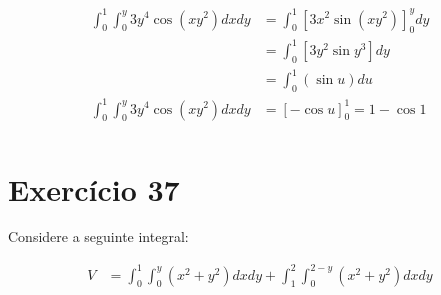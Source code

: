 \documentclass{article}
\theoremstyle{definition}
\begin{document}
        \begin{align*}
            \int_0^1 \int_0^y 3y^4\cos{(xy^2)} dx dy &= \int_0^1 \left[ 3x^2 \sin{(xy^2)} \right]_0^y dy\\
            &= \int_0^1 [3y^2 \sin{y^3}] dy\\
            &= \int_0^1 (\sin{u}) du\\
            \int_0^1 \int_0^y 3y^4\cos{(xy^2)} dx dy &= [-\cos{u}]_0^1 = 1 - \cos{1}\\
        \end{align*}

    \section{Exercício 37}
        Considere a seguinte integral:

        \begin{align*}
            V &= \int_0^1 \int_0^y (x^2 + y^2) dx dy + \int_1^2 \int_0^{2 - y} (x^2 + y^2) dxdy
        \end{align*}
        
\end{document}
